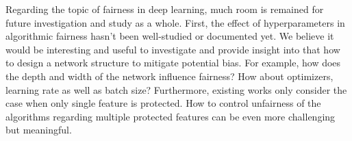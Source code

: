 Regarding the topic of fairness in deep learning, much room is remained for future investigation and study as a whole. First, the effect of hyperparameters in algorithmic fairness hasn't been well-studied  or documented yet. We believe it would be interesting and useful to investigate and provide insight into that how to design a network structure to mitigate potential bias. For example, how does the depth and width of the network influence fairness? How about optimizers, learning rate as well as batch size? Furthermore, existing works only consider the case when only single feature is protected. How to control unfairness of the algorithms regarding multiple protected features can be even more challenging but meaningful. 